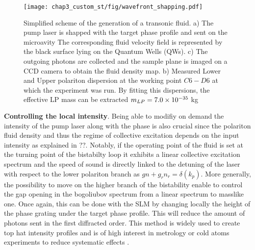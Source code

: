 \begin{figure}
    \centering
    \texttt{[image: chap3\_custom\_st/fig/wavefront\_shapping.pdf]}
    \caption{Simplified scheme of the generation of a transonic fluid. a) The pump laser is shapped with the target phase profile and sent on the microavity The corresponding fluid velocity field is represented by the black surface lying on the Quantum Wells (QWs). c) The outgoing photons are collected and the sample 
    plane is imaged on a CCD camera to obtain the fluid density map.  b) Measured Lower and Upper polariton dispersion at the working point $C6-D6$ at which the experiment was run. By fitting this dispersions,
    the effective LP mass can be extracted $m_{LP}= 7.0 \times 10^{-35}$ kg}
    \label{fig:wavefront_shapping}
\end{figure}


\bigskip 

\textbf{Controlling the local intensity}. Being able to modifiy on demand the intensity of the pump laser along with the phase is also crucial since the polariton fluid density and thus the regime of collective excitation 
depends on the input intensity as explained in ??. Notably, if the operating point of the fluid is set at the turning point of the bistabilty loop it exhibits a linear collective excitation spectrum and the speed of sound is directly 
linked to the detuning of the laser with respect to the lower polariton branch as $gn+g_rn_r=\delta(k_p)$. More generally, the possibility to move on the higher branch of the bistability enable to control the gap opening in the bogoliubov spectrum from a linear spectrum to masslike one. 
Once again, this can be done with the SLM by changing locally the height of the phase grating under the target phase profile. This will reduce the amount of photons sent in the first diffracted order. This method is widely used to
create top hat intensity profiles and is of high interest in metrology or cold atoms experiments to reduce systematic effects \cite{top_metrology_2018}.

\bigskip


